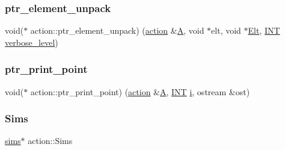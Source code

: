 \mbox{\label{classaction_a40e466ff0d6e3520a4aebd628084bdde}} 
\subsubsection{\texorpdfstring{ptr\+\_\+element\+\_\+unpack}{ptr\_element\_unpack}}
{\footnotesize\ttfamily void($\ast$ action\+::ptr\+\_\+element\+\_\+unpack) (\mbox{\hyperlink{classaction}{action}} \&\mbox{\hyperlink{simeon_8_c_a97833f04c3a9c008df5521a2fc291bb4}{A}}, void $\ast$elt, void $\ast$\mbox{\hyperlink{simeon_8_c_aec1406935bdb1fee3561fcb840964100}{Elt}}, \mbox{\hyperlink{galois_8h_a09fddde158a3a20bd2dcadb609de11dc}{I\+NT}} \mbox{\hyperlink{simeon_8_c_a818073fbcc2f439e7c56952f67386122}{verbose\+\_\+level}})}

\mbox{\label{classaction_a4c4bb26f9c21950d561fe63a6c875fa6}} 
\subsubsection{\texorpdfstring{ptr\+\_\+print\+\_\+point}{ptr\_print\_point}}
{\footnotesize\ttfamily void($\ast$ action\+::ptr\+\_\+print\+\_\+point) (\mbox{\hyperlink{classaction}{action}} \&\mbox{\hyperlink{simeon_8_c_a97833f04c3a9c008df5521a2fc291bb4}{A}}, \mbox{\hyperlink{galois_8h_a09fddde158a3a20bd2dcadb609de11dc}{I\+NT}} \mbox{\hyperlink{alphabet2_8_c_acb559820d9ca11295b4500f179ef6392}{i}}, ostream \&ost)}

\mbox{\label{classaction_ab0d959d43c9c75db1ae176951b5be65f}} 
\subsubsection{\texorpdfstring{Sims}{Sims}}
{\footnotesize\ttfamily \mbox{\hyperlink{classsims}{sims}}$\ast$ action\+::\+Sims}

\mbox{\label{classaction_a45a386a60504d9cf2bc2ad4909a95d1a}} 
